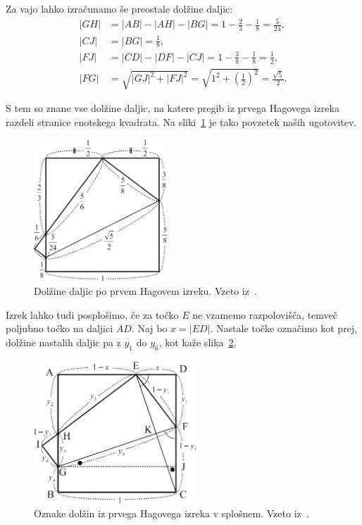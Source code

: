 Za vajo lahko izračunamo še preostale dolžine daljic:
\begin{align*}
    |GH| &= |AB| - |AH| - |BG| = 1 - \frac{2}{3} - \frac{1}{8} = \frac{5}{24},\\
    |CJ| &= |BG| = \frac{1}{8},\\
    |FJ| &= |CD| - |DF| - |CJ| = 1 - \frac{3}{8} - \frac{1}{8} = \frac{1}{2},\\
    |FG| &= \sqrt{|GJ|^2 + |FJ|^2} = \sqrt{1^2 + \left(\frac{1}{2}\right)^2} = \frac{\sqrt{5}}{2}.
\end{align*}

S tem so znane vse dolžine daljic, na katere pregib iz prvega Hagovega izreka razdeli stranice enotskega kvadrata. Na sliki~\ref{fig:hagov_izrek1_st} je tako povzetek naših ugotovitev.

\begin{figure}[h]
    \centering
    \includegraphics[width=0.45\textwidth]{images/hagovi_izreki/hagov_izrek1_stevilke.png}
    \caption[Prvi Hagov izrek v številkah]{Dolžine daljic po prvem Hagovem izreku. Vzeto iz~\cite[str. 7]{haga2008}.}
    \label{fig:hagov_izrek1_st}
\end{figure}

Izrek lahko tudi posplošimo, če za točko $E$ ne vzamemo razpolovišča, temveč poljubno točko na daljici $AD$. Naj bo $x = |ED|$. Nastale točke označimo kot prej, dolžine nastalih daljic pa z $y_1$ do $y_6$, kot kaže slika~\ref{fig:hagov_izrek1_splosen}.

\begin{figure}[h]
    \centering
    \includegraphics[width=0.55\textwidth]{images/hagovi_izreki/hagov_izrek1_splosen.png}
    \caption[Prvi Hagov izrek v splošnem]{Oznake dolžin iz prvega Hagovega izreka v splošnem. Vzeto iz~\cite[str. 9]{haga2008}.}
    \label{fig:hagov_izrek1_splosen}
\end{figure}

